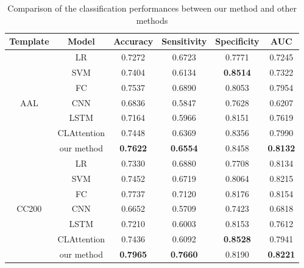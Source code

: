 \documentclass[journal,twoside,web]{ieeecolor}
\begin{document}
\begin{table}[]
	\centering
	\caption{Comparison of the classification performances between our method and other methods}\label{Table4}
	\tabcolsep=0.95cm
	\begin{tabular*}{\textwidth}{cccccc}
		\toprule
		\multicolumn{1}{l}{\textbf{Template}} & \textbf{Model} & \textbf{Accuracy}         & \textbf{Sensitivity}      & \textbf{Specificity} & \textbf{AUC}               \\ 
		\midrule
		\multirow{7}{*}{AAL}                  & LR             & 0.7272                    & 0.6723                    & 0.7771               & 0.7245                     \\
		& SVM            & 0.7404                    & 0.6134                    & \textbf{0.8514}      & 0.7322                     \\
		& FC             & 0.7537                    & 0.6890                    & 0.8053               & 0.7954                     \\
		& CNN            & 0.6836                    & 0.5847                    & 0.7628               & 0.6207                     \\
		& LSTM           & 0.7164                    & 0.5966                    & 0.8151               & 0.7619                     \\
		& CLAttention    & 0.7448                    & 0.6369                    & 0.8356               & 0.7990                     \\
		& our method     & \textbf{\textbf{0.7622}}  & \textbf{\textbf{0.6554}}  & 0.8458               & \textbf{\textbf{0.8132}}   \\ 
		\midrule
		\multirow{7}{*}{CC200}                & LR             & 0.7330                    & 0.6880                    & 0.7708               & 0.8134                     \\
		& SVM            & 0.7452                    & 0.6719                    & 0.8064               & 0.8215                     \\
		& FC             & 0.7737                    & 0.7120                    & 0.8176               & 0.8154                     \\
		& CNN            & 0.6652                    & 0.5709                    & 0.7423               & 0.6818                     \\
		& LSTM           & 0.7210                    & 0.6003                    & 0.8153               & 0.7612                     \\
		& CLAttention    & 0.7436                    & 0.6092                    & \textbf{0.8528}      & 0.7941                     \\
		& our method     & \textbf{0.7965}           & \textbf{0.7660}           & 0.8190               & \textbf{0.8221}           \\
		\bottomrule
	\end{tabular*}
\end{table}
\end{document}
